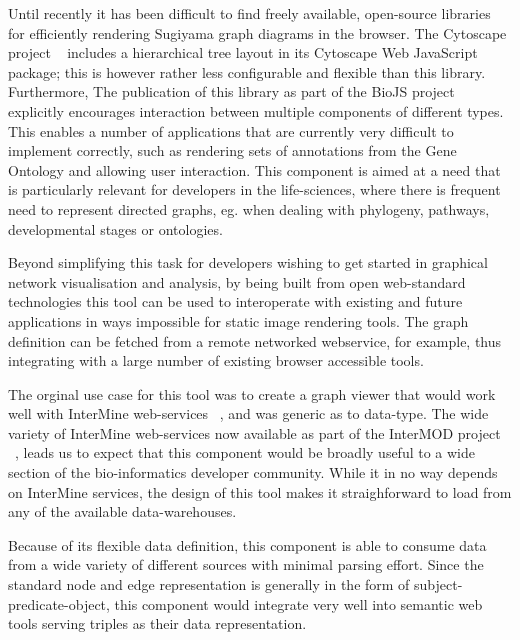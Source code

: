 \documentclass[10pt,a4paper,twocolumn]{article}
\begin{document}
Until recently it has been difficult to find freely available, open-source
libraries for efficiently rendering Sugiyama graph diagrams in the browser. The
Cytoscape project ~\cite{cytoscape} includes a hierarchical tree layout in its
Cytoscape Web JavaScript package; this is however rather less configurable and
flexible than this library. Furthermore, The publication of this library as part
of the BioJS project explicitly encourages interaction between multiple
components of different types. This enables a number of applications that are
currently very difficult to implement correctly, such as rendering sets of
annotations from the Gene Ontology and allowing user interaction. This component
is aimed at a need that is particularly relevant for developers in the
life-sciences, where there is frequent need to represent directed graphs, eg.
when dealing with phylogeny, pathways, developmental stages or ontologies.

Beyond simplifying this task for developers wishing to get started in graphical
network visualisation and analysis, by being built from open web-standard
technologies this tool can be used to interoperate with existing and future
applications in ways impossible for static image rendering tools. The graph
definition can be fetched from a remote networked webservice, for example, thus
integrating with a large number of existing browser accessible tools.

The orginal use case for this tool was to create a graph viewer that would work
well with InterMine web-services ~\cite{intermine}, and was generic as to
data-type.  The wide variety of InterMine web-services now available as part of
the InterMOD project ~\cite{intermod}, leads us to expect that this component
would be broadly useful to a wide section of the bio-informatics developer
community.  While it in no way depends on InterMine services, the design of this
tool makes it straighforward to load from any of the available data-warehouses.

Because of its flexible data definition, this component is able to consume data
from a wide variety of different sources with minimal parsing effort. Since the
standard node and edge representation is generally in the form of
subject-predicate-object, this component would integrate very well into semantic
web tools serving triples as their data representation.
\end{document}
